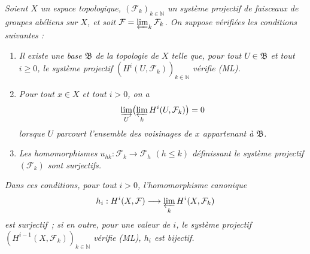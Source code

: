 \begin{proposition}[13.3.1]
\label{0.13.3.1-fr}
\emph{Soient $X$ un espace topologique,
$(\mathcal F_k)_{k\in\mathbb N}$ un système projectif de faisceaux de
groupes abéliens sur $X$, et soit
$\mathcal F=\varprojlim_k\mathcal F_k$. On suppose vérifiées les conditions
suivantes :}
\begin{enumerate}
\item[\emph{(i)}]
\emph{Il existe une base $\mathfrak B$ de la topologie de $X$ telle que,
pour tout $U\in\mathfrak B$ et tout $i\geq0$, le système projectif
$(H^i(U,\mathcal F_k))_{k\in\mathbb N}$ vérifie (ML).}
\item[\emph{(ii)}]
\emph{Pour tout $x\in X$ et tout $i>0$, on a}
\[
\varinjlim_U\bigl(\varprojlim_k H^i(U,\mathcal F_k)\bigr)=0
\]
\emph{lorsque $U$ parcourt l'ensemble des voisinages de $x$ appartenant à
$\mathfrak B$.}
\item[\emph{(iii)}]
\emph{Les homomorphismes
$u_{hk}:\mathcal F_k\to\mathcal F_h$ $(h\leq k)$ définissant le système
projectif $(\mathcal F_k)$ sont surjectifs.}
\end{enumerate}
\emph{Dans ces conditions, pour tout $i>0$, l'homomorphisme canonique}
\[
h_i:H^i(X,\mathcal F)\longrightarrow
\varprojlim_k H^i(X,\mathcal F_k)
\]
\emph{est surjectif~; si en outre, pour une valeur de $i$, le système
projectif $(H^{i-1}(X,\mathcal F_k))_{k\in\mathbb N}$ vérifie (ML), $h_i$
est bijectif.}
\end{proposition}

